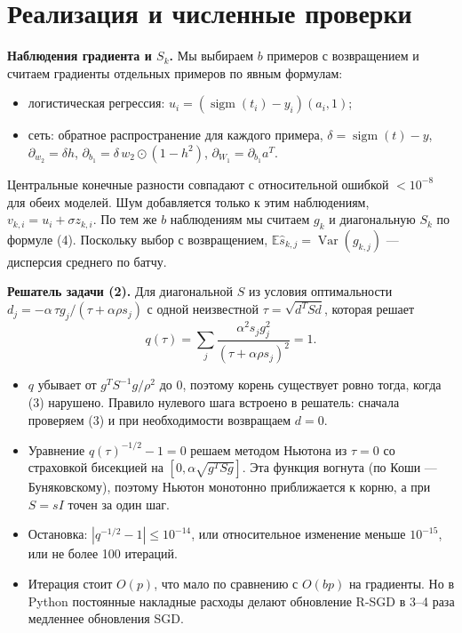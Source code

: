 \documentclass[11pt,a4paper]{article}
\newcommand{\E}{\mathbb{E}}
\DeclareMathOperator{\Var}{Var}
\DeclareMathOperator{\sigm}{sigm}
\begin{document}
\section{Реализация и численные проверки}

\textbf{Наблюдения градиента и $S_k$.} Мы выбираем $b$ примеров с возвращением и считаем
градиенты отдельных примеров по явным формулам:
\begin{itemize}
\item логистическая регрессия: $u_i=(\sigm(t_i)-y_i)(a_i,1)$;
\item сеть: обратное распространение для каждого примера, $\delta=\sigm(t)-y$,
$\partial_{w_2}=\delta h$, $\partial_{b_1}=\delta\,w_2\odot(1-h^2)$, $\partial_{W_1}=\partial_{b_1}a^T$.
\end{itemize}
Центральные конечные разности совпадают с относительной ошибкой $<10^{-8}$ для обеих моделей. Шум
добавляется только к этим наблюдениям, $v_{k,i}=u_i+\sigma z_{k,i}$. По тем же $b$ наблюдениям мы
считаем $g_k$ и диагональную $S_k$ по формуле (4). Поскольку выбор с возвращением,
$\E\widehat s_{k,j}=\Var(g_{k,j})$ — дисперсия среднего по батчу.

\textbf{Решатель задачи (2).} Для диагональной $S$ из условия оптимальности
$d_j=-\alpha\,\tau g_j/(\tau+\alpha\rho s_j)$ с одной неизвестной $\tau=\sqrt{d^TSd}$, которая решает
\begin{equation*}
q(\tau)=\sum_j\frac{\alpha^2s_jg_j^2}{(\tau+\alpha\rho s_j)^2}=1 .
\end{equation*}
\begin{itemize}
\item $q$ убывает от $g^TS^{-1}g/\rho^2$ до $0$, поэтому корень существует ровно тогда, когда (3)
нарушено. Правило нулевого шага встроено в решатель: сначала проверяем (3) и при необходимости
возвращаем $d=0$.
\item Уравнение $q(\tau)^{-1/2}-1=0$ решаем методом Ньютона из $\tau=0$ со страховкой бисекцией на
$[0,\alpha\sqrt{g^TSg}]$. Эта функция вогнута (по Коши — Буняковскому), поэтому Ньютон монотонно
приближается к корню, а при $S=sI$ точен за один шаг.
\item Остановка: $|q^{-1/2}-1|\le10^{-14}$, или относительное изменение меньше $10^{-15}$, или не
более 100 итераций.
\item Итерация стоит $O(p)$, что мало по сравнению с $O(bp)$ на градиенты. Но в Python постоянные
накладные расходы делают обновление R-SGD в 3--4 раза медленнее обновления SGD.
\end{itemize}
\end{document}
